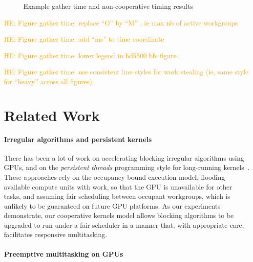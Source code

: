 \documentclass[numbers,nocopyrightspace,10pt]{sigplanconf}
\newcommand{\HEComment}[1]{\textcolor{orange}{HE: #1}}
\begin{document}
\begin{figure}
\caption{Example gather time and non-cooperative timing results}\label{fig:fine-grained-timing}
\end{figure}

\HEComment{Figure gather time: replace ``O'' by ``M'' , ie max nb of active workgroups}

\HEComment{Figure gather time: add ``ms'' to time coordinate}

\HEComment{Figure gather time: lower legend in hd5500 bfs figure}

\HEComment{Figure gather time: use consistent line styles for work stealing (ie, same style for ``heavy'' across all figures)}

\section{Related Work}\label{sec:relatedwork}

\paragraph{Irregular algorithms and persistent kernels}

There has been a lot of work on accelerating blocking irregular
algorithms using GPUs, and on the \emph{persistent threads}
programming style for long-running
kernels~\cite{owens-persistent,DBLP:conf/ipps/KaleemVPHP16,DBLP:conf/ipps/DavidsonBGO14,DBLP:conf/hipc/HarishN07,DBLP:journals/topc/MerrillGG15,DBLP:conf/egh/VineetHPN09,DBLP:conf/ppopp/NobariCKB12,DBLP:conf/hpcc/SolomonTT10a,DBLP:conf/popl/PrabhuRMH11,DBLP:conf/ppopp/Mendez-LojoBP12,DBLP:conf/oopsla/PaiP16,DBLP:conf/oopsla/SorensenDBGR16,DBLP:conf/egh/CedermanT08,TPO10,BNP12,Pannotia}.
These approaches rely on the occupancy-bound execution model, flooding
available compute units with work, so that the GPU is unavailable for
other tasks, and assuming fair scheduling between occupant workgroups,
which is unlikely to be guaranteed on future GPU platforms.
%
As our experiments demonstrate, our cooperative kernels model allows blocking algorithms
to be upgraded to run under a fair scheduler in a manner that, with
appropriate care, facilitates responsive multitasking.

\paragraph{Preemptive multitasking on GPUs}
\end{document}
